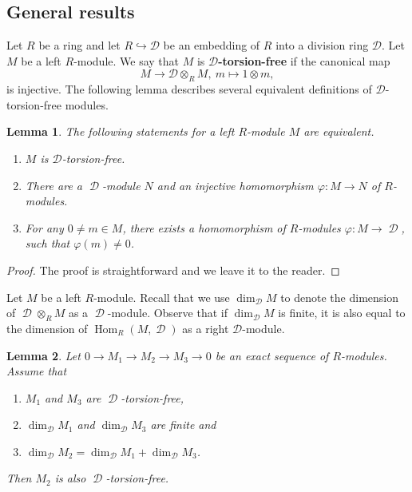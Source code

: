 \documentclass[11pt]{amsart}
\newtheorem{lem}{Lemma}[section]
\numberwithin{claimcounter}{lem}
\DeclareMathOperator{\D}{\mathcal D}
\DeclareMathOperator{\Hom}{Hom}
\begin{document}
\subsection{General results}
Let $R$ be a ring and let $R\hookrightarrow \mathcal D$ be an embedding of $R$ into a division ring $\mathcal D$. Let $M$ be a left $R$-module. We say that $M$ is {\bf $\mathcal D$-torsion-free} if the canonical map $$M\to \mathcal D\otimes_R M, \ m\mapsto 1\otimes m,$$ is injective.  
The following lemma describes several   equivalent definitions of $\mathcal D$-torsion-free modules.

\begin{lem} \label{dtorsionfree}The following statements for a left $R$-module $M$ are equivalent.
\begin{enumerate}
\item[(a)] $M$ is $\mathcal D$-torsion-free.
\item[(b)] There are a $\D$-module $N$ and  an injective homomorphism $\varphi:M\to N$ of $R$-modules.
\item[(c)] For any $0\ne m\in M$, there exists a homomorphism of $R$-modules $\varphi:M\to \D$, such that $\varphi(m)\ne 0$.

\end{enumerate}

\end{lem}
\begin{proof} The proof is straightforward and we leave it to the reader.\end{proof}
Let $M$ be a left $R$-module. Recall that we use  $\dim_{\D} M $ to denote the dimension of $\D\otimes_RM$ as a $\D$-module. Observe that if  $\dim_{\D} M $ is finite, it is also equal to the dimension of $\Hom_R(M, \D)$ as a right $\mathcal D$-module.
\begin{lem} \label{dtf}
Let $0\to M_1\to M_2\to M_3\to 0$ be an exact sequence of $R$-modules. Assume that 
\begin{enumerate}
\item $M_1$ and $M_3$ are $\D$-torsion-free, 
\item $\dim_{\D} M_1$ and $\dim_{\D} M_3$ are finite and 
\item $\dim_{\D} M_2= \dim_{\D} M_1+\dim_{\D} M_3$.
\end{enumerate}
Then $M_2$ is also $\D$-torsion-free.
\end{lem}
\end{document}
